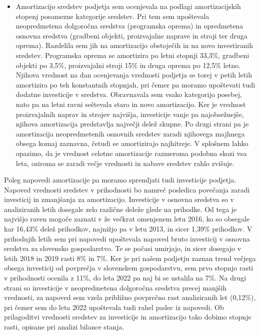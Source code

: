 \documentclass[12pt,a4paper]{amsart}
\theoremstyle{definition} %
\theoremstyle{plain} %
\begin{document}
\begin{itemize}
\begin{itemize}
\item Amortizacijo sredstev podjetja sem ocenjevala na podlagi amortizacijskih stopenj posamezne kategorije sredstev. Pri tem sem upoštevala neopredmetena dolgoročna sredstva (programska oprema) in opredmetena osnovna sredstva (gradbeni objekti, proizvajalne naprave in stroji ter druga oprema). Razdelila sem jih na amortizacijo obstoječih in na novo investiranih sredstev. Programska oprema se amortizira po letni stopnji 33,3\%, gradbeni objekti po 3,5\%, proizvajalni stroji 15\% in druga oprema po 12,5\% letno. Njihova vrednost na dan ocenjevanja vrednosti podjetja se torej v petih letih amortizira po teh konstantnih stopnjah, pri čemer pa moramo upoštevati tudi dodatne investicije v sredstva. Obravnavala sem vsako kategorijo posebej, nato pa na letni ravni seštevala staro in novo amortizacijo. Ker je vrednost proizvajalnih naprav in strojev najvišja, investicije vanje pa najobsežnejše, njihova amortizacija predstavlja največji delež skupne. Po drugi strani pa je amortizacija neopredmetenih osnovnih sredstev zaradi njihovega majhnega obsega komaj zaznavna, četudi se amortizirajo najhitreje. V splošnem lahko opazimo, da je vrednost celotne amortizacije razmeroma podobna skozi vsa leta, oziroma se zaradi večje vrednosti in nabave sredstev rahlo zvišuje.\\
\end{itemize}
Poleg napovedi amortizacije pa moramo spremljati tudi investicije podjetja. Napoved vrednosti sredstev v prihodnosti bo namreč posledica povečanja zaradi investicij in zmanjšanja za amortizacijo. Investicije v osnovna sredstva so v analiziranih letih dosegale zelo različne deleže glede na prihodke. Od tega je najvišjo raven mogoče zaznati v že večkrat omenjenem letu 2016, ko so obsegale kar 16,43\% delež prihodkov, najnižjo pa v letu 2013, in sicer 1,39\% prihodkov. V prihodnjih letih sem pri napovedi upoštevala napoved bruto investicij v osnovna sredstva za slovensko gospodarstvo. Te se počasi umirjajo, in sicer dosegajo v letih 2018 in 2019 rasti 8\% in 7\%. Ker je pri našem podjetju zaznan trend večjega obsega investicij od povprečja v slovenskem gospodarstvu, sem prvo stopnjo rasti v prihodnosti ocenila z 11\%, do leta 2022 pa naj bi se ustalila na 7\%. Na drugi strani so investicije v neopredmetena dolgoročna sredstva precej manjših vrednosti, za napoved sem vzela približno povprečno rast analiziranih let (0,12\%), pri čemer sem do leta 2022 upoštevala tudi rahel padec iz napovedi. Ob prilagoditvi vrednosti sredstev za investicije in amortizacijo tako dobimo stopnje rasti, opisane pri analizi bilance stanja.

\end{itemize}
\end{document}
